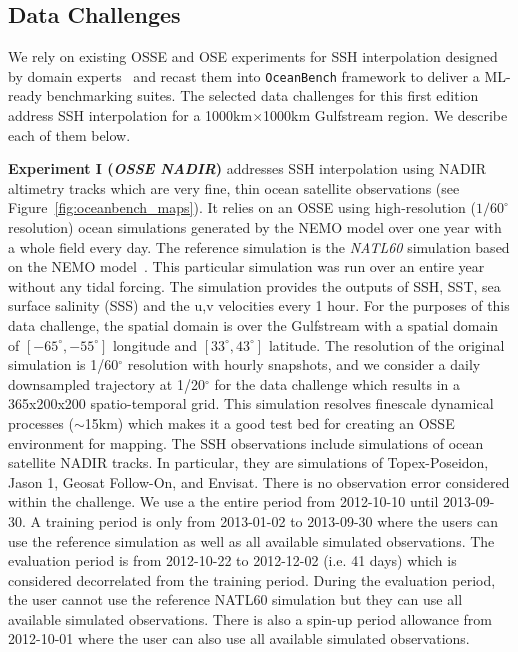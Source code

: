 %
\subsection*{Data Challenges} \label{sec:data_challenges}
We rely on existing OSSE and OSE experiments for SSH interpolation designed by domain experts~\cite{DCOSEGULFSSH,DCOSSEGULFSSH} and recast them into \texttt{OceanBench} framework to deliver a ML-ready benchmarking suites. 
The selected data challenges for this first edition address SSH interpolation for a 1000km$\times$1000km Gulfstream region. We describe each of them below.

\textbf{Experiment I (\textit{OSSE NADIR})} addresses SSH interpolation using NADIR altimetry tracks which are very fine, thin ocean satellite observations (see Figure~\ref{fig:oceanbench_maps}). It relies on an OSSE using high-resolution ($1/60^\circ$ resolution) ocean simulations generated by the NEMO model over one year with a whole field every day. 
The reference simulation is the \textit{NATL60} simulation based on the NEMO model~\cite{NEMOAJAYI2020}. 
This particular simulation was run over an entire year without any tidal forcing.
The simulation provides the outputs of SSH, SST, sea surface salinity (SSS) and the u,v velocities every 1 hour.
For the purposes of this data challenge, the spatial domain is over the Gulfstream with a spatial domain of $[-65^\circ, -55^\circ]$ longitude and $[33^\circ, 43^\circ]$ latitude.
The resolution of the original simulation is 1/60$^\circ$ resolution with hourly snapshots, and we consider a daily downsampled trajectory at 1/20$^\circ$ for the data challenge which results in a 365x200x200 spatio-temporal grid.
This simulation resolves finescale dynamical processes ($\sim$15km) which makes it a good test bed for creating an OSSE environment for mapping.
The SSH observations include simulations of ocean satellite NADIR tracks.
In particular, they are simulations of Topex-Poseidon, Jason 1, Geosat Follow-On, and Envisat.
There is no observation error considered within the challenge.
We use a the entire period from 2012-10-10 until 2013-09-30.
A training period is only from 2013-01-02 to 2013-09-30 where the users can use the reference simulation as well as all available simulated observations.
The evaluation period is from 2012-10-22 to 2012-12-02 (i.e. 41 days) which is considered decorrelated from the training period. 
During the evaluation period, the user cannot use the reference NATL60 simulation but they can use all available simulated observations. There is also a spin-up period allowance from 2012-10-01 where the user can also use all available simulated observations.

